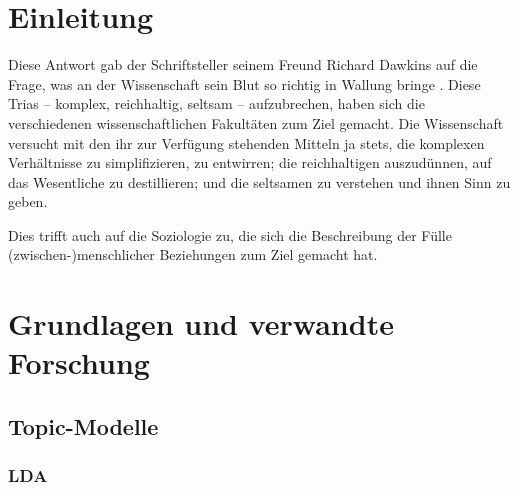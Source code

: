 \documentclass[11pt,a4paper,twoside]{article}
\begin{document}
{
\setcounter{tocdepth}{3}
\tableofcontents
}
\cleardoublepage

\setcounter{page}{1}

\fancyhead[LE,RO]{\rightmark}
\fancyhead[LO,RE]{\leftmark}
\fancyfoot[LE,RO]{\thepage}

\cleardoublepage

\hypertarget{einleitung}{%
\section{Einleitung}\label{einleitung}}

\vspace{1.5cm}

Diese Antwort gab der Schriftsteller seinem Freund Richard Dawkins auf
die Frage, was an der Wissenschaft sein Blut so richtig in Wallung
bringe \autocite[S. 170]{Dawkins2004}. Diese Trias -- komplex,
reichhaltig, seltsam -- aufzubrechen, haben sich die verschiedenen
wissenschaftlichen Fakultäten zum Ziel gemacht. Die Wissenschaft
versucht mit den ihr zur Verfügung stehenden Mitteln ja stets, die
komplexen Verhältnisse zu simplifizieren, zu entwirren; die
reichhaltigen auszudünnen, auf das Wesentliche zu destillieren; und die
seltsamen zu verstehen und ihnen Sinn zu geben.

Dies trifft auch auf die Soziologie zu, die sich die Beschreibung der
Fülle (zwischen-)menschlicher Beziehungen zum Ziel gemacht hat.

\cleardoublepage

\hypertarget{grundlagen-und-verwandte-forschung}{%
\section{Grundlagen und verwandte
Forschung}\label{grundlagen-und-verwandte-forschung}}

\hypertarget{topic-modelle}{%
\subsection{Topic-Modelle}\label{topic-modelle}}

\hypertarget{lda}{%
\subsubsection{LDA}\label{lda}}
\end{document}

